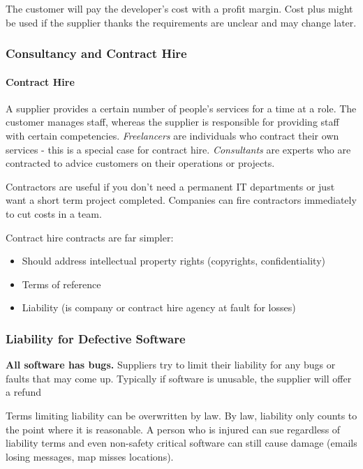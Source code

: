 The customer will pay the developer's cost with a profit margin.
Cost plus might be used if the supplier thanks the requirements are unclear and may change later.

\subsubsection{Consultancy and Contract Hire}\label{ssub:consultancy_and_contract_hire}

\paragraph{Contract Hire}\label{par:contract_hire}

A supplier provides a certain number of people's services for a time at a role.
The customer manages staff, whereas the supplier is responsible for providing staff with certain competencies.
\emph{Freelancers} are individuals who contract their own services - this is a special case for contract hire.
\emph{Consultants} are experts who are contracted to advice customers on their operations or projects.

Contractors are useful if you don't need a permanent IT departments or just want a short term project completed.
Companies can fire contractors immediately to cut costs in a team.

\medskip
\noindent
Contract hire contracts are far simpler:

\begin{itemize}
    \item Should address intellectual property rights (copyrights, confidentiality)
    \item Terms of reference
    \item Liability (is company or contract hire agency at fault for losses)
\end{itemize}

\subsubsection{Liability for Defective Software}\label{ssub:liability_for_defective_software}

\textbf{All software has bugs.}
Suppliers try to limit their liability for any bugs or faults that may come up.
Typically if software is unusable, the supplier will offer a refund

Terms limiting liability can be overwritten by law.
By law, liability only counts to the point where it is reasonable.
A person who is injured can sue regardless of liability terms and even non-safety critical software can still cause damage (emails losing messages, map misses locations).
